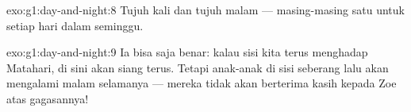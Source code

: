 \begin{solution}{exo:g1:day-and-night:8}
Tujuh kali  dan tujuh malam --- masing-masing satu
untuk setiap hari dalam seminggu.
\end{solution}

\begin{solution}{exo:g1:day-and-night:9}
Ia bisa saja benar: kalau sisi kita terus menghadap Matahari, di sini
akan siang terus. Tetapi anak-anak di sisi seberang lalu akan
mengalami malam selamanya --- mereka tidak akan berterima kasih kepada
Zoe atas gagasannya!
\end{solution}
